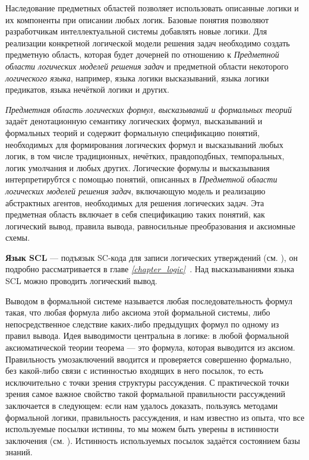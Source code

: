 Наследование предметных областей позволяет использовать описанные логики и их компоненты при описании любых логик. Базовые понятия позволяют разработчикам интеллектуальной системы добавлять новые логики. Для реализации конкретной логической модели решения задач необходимо создать предметную область, которая будет дочерней по отношению к \textit{Предметной области логических моделей решения задач} и предметной области некоторого \textit{логического языка}, например, языка логики высказываний, языка логики предикатов, языка нечёткой логики и других.

\textit{Предметная область логических формул, высказываний и формальных теорий} задаёт денотационную семантику логических формул, высказываний и формальных теорий и содержит формальную спецификацию понятий, необходимых для формирования логических формул и высказываний любых логик, в том числе традиционных, нечётких, правдоподбных, темпоральных, логик умолчания и любых других. Логические формулы и высказывания интерпретирубтся с помощью понятий, описанных в \textit{Предметной области логических моделей решения задач}, включающую модель и реализацию абстрактных агентов, необходимых для решения логических задач. Эта предметная область включает в себя спецификацию таких понятий, как логический вывод, правила вывода, равносильные преобразования и аксиомные схемы.

\textbf{Язык SCL} — подъязык SC-кода для записи логических утверждений (см. ), он подробно рассматривается в главе \textit{\ref{chapter_logic}~}. Над высказываниями языка SCL можно проводить логический вывод.

Выводом в формальной системе называется любая последовательность формул такая, что любая формула либо аксиома этой формальной системы, либо непосредственное следствие каких-либо предыдущих формул по одному из правил вывода. Идея выводимости центральна в логике: в любой формальной аксиоматической теории теорема --- это формула, которая выводится из аксиом. Правильность умозаключений вводится и проверяется совершенно формально, без какой-либо связи с истинностью входящих в него посылок, то есть исключительно с точки зрения структуры рассуждения. С практической точки зрения самое важное свойство такой формальной правильности рассуждений заключается в следующем: если нам удалось доказать, пользуясь методами формальной логики, правильность рассуждения, и нам известно из опыта, что все используемые посылки истинны, то мы можем быть уверены в истинности заключения (см. ). Истинность используемых посылок задаётся состоянием базы знаний.

